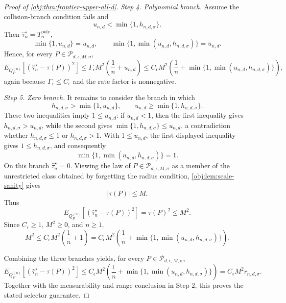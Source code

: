 \documentclass[11pt]{article}
\begin{document}
\begin{proof}[Proof of \cref{obj:thm:frontier-upper-all-d}]
\emph{Step 4. Polynomial branch.}
Assume the collision-branch condition fails and
\[
u_{n,d}<\min\{1,h_{n,d,\sigma}\}.
\]
Then \(\widehat\tau_n^{\star}=T_n^{\mathrm{poly}}\),
\[
\min\{1,u_{n,d}\}=u_{n,d},
\qquad
\min\{1,\min(u_{n,d},h_{n,d,\sigma})\}=u_{n,d}.
\]
Hence, for every \(P\in\mathcal P_{d,\epsilon,M,\sigma}\),
\[
E_{Q_P^{(n)}}\!\left[
\left(\widehat\tau_n^{\star}-\tau(P)\right)^2
\right]
\le
\Gamma_{\epsilon}M^2
\left(\frac1n+u_{n,d}\right)
\le
C_{\epsilon}M^2
\left(\frac1n+\min\{1,\min(u_{n,d},h_{n,d,\sigma})\}\right),
\]
again because \(\Gamma_{\epsilon}\le C_{\epsilon}\) and the rate factor is nonnegative. %

\emph{Step 5. Zero branch.}
It remains to consider the branch in which
\[
h_{n,d,\sigma}>\min\{1,u_{n,d}\},
\qquad
u_{n,d}\ge \min\{1,h_{n,d,\sigma}\}.
\]
These two inequalities imply \(1\le u_{n,d}\): if \(u_{n,d}<1\), then the first inequality gives
\(h_{n,d,\sigma}>u_{n,d}\), while the second gives
\(\min\{1,h_{n,d,\sigma}\}\le u_{n,d}\), a contradiction whether
\(h_{n,d,\sigma}\le1\) or \(h_{n,d,\sigma}>1\).  With \(1\le u_{n,d}\), the first displayed
inequality gives \(1\le h_{n,d,\sigma}\), and consequently
\[
\min\{1,\min(u_{n,d},h_{n,d,\sigma})\}=1.
\]
On this branch \(\widehat\tau_n^{\star}=0\).  Viewing the law of
\(P\in\mathcal P_{d,\epsilon,M,\sigma}\) as a member of the unrestricted class obtained by
forgetting the radius condition, \cref{obj:lem:scale-sanity} gives
\[
|\tau(P)|\le M.
\]
Thus
\[
E_{Q_P^{(n)}}\!\left[
\left(\widehat\tau_n^{\star}-\tau(P)\right)^2
\right]
=
\tau(P)^2
\le M^2.
\]
Since \(C_{\epsilon}\ge1\), \(M^2\ge0\), and \(n\ge1\),
\[
M^2
\le
C_{\epsilon}M^2\left(\frac1n+1\right)
=
C_{\epsilon}M^2
\left(\frac1n+\min\{1,\min(u_{n,d},h_{n,d,\sigma})\}\right).
\] %

Combining the three branches yields, for every
\(P\in\mathcal P_{d,\epsilon,M,\sigma}\),
\[
E_{Q_P^{(n)}}\!\left[
\left(\widehat\tau_n^{\star}-\tau(P)\right)^2
\right]
\le
C_{\epsilon}M^2
\left(\frac1n+\min\{1,\min(u_{n,d},h_{n,d,\sigma})\}\right)
=
C_{\epsilon}M^2 r_{n,d,\sigma}.
\]
Together with the measurability and range conclusion in Step 2, this proves the stated
selector guarantee. %
\end{proof}
\end{document}

